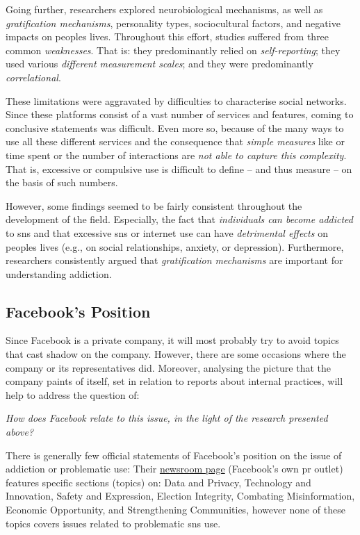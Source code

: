 Going further, researchers explored neurobiological mechanisms, as well as \textit{gratification mechanisms}, personality types, sociocultural factors, and negative impacts on peoples lives. 
Throughout this effort, studies suffered from three common \textit{weaknesses}.
That is: they predominantly relied on \textit{self-reporting}; they used various \textit{different measurement scales}; and they were predominantly \textit{correlational}.

These limitations were aggravated by difficulties to characterise social networks. 
Since these platforms consist of a vast number of services and features, coming to conclusive statements was difficult. 
Even more so, because of the many ways to use all these different services and the consequence that 
\textit{simple measures} like or time spent or the number of interactions are \textit{not able to capture this complexity}. 
That is, excessive or compulsive use is difficult to define -- and thus measure -- on the basis of such numbers.

However, some findings seemed to be fairly consistent throughout the development of the field.
Especially, the fact that \textit{individuals can become addicted} to \gls{sns} and that excessive \gls{sns} or internet use can have \textit{detrimental effects} on peoples lives (e.g., on social relationships, anxiety, or depression). 
Furthermore, researchers consistently argued that \textit{gratification mechanisms} are important for understanding addiction.

\subsection{Facebook's Position}
Since Facebook is a private company, it will most probably try to avoid topics that cast shadow on the company. 
However, there are some occasions where the company or its representatives did. 
Moreover, analysing the picture that the company paints of itself, set in relation to reports about internal practices, will help to address the question of:

\textit{How does Facebook relate to this issue, in the light of the research presented above?}

There is generally few official statements of Facebook's position on the issue of addiction or problematic use: 
Their \href{https://about.fb.com/news/}{newsroom page} (Facebook's own \gls{pr} outlet) features specific sections (topics) on: Data and Privacy, Technology and Innovation, Safety and Expression, Election Integrity, Combating Misinformation, Economic Opportunity, and Strengthening Communities, however none of these topics covers issues related to problematic \gls{sns} use.

